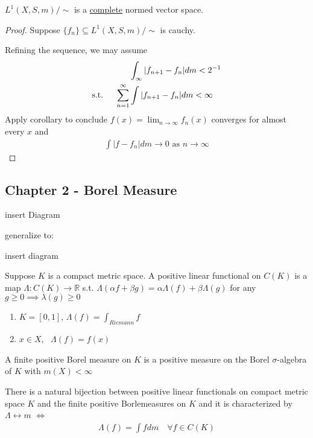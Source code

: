 \begin{corollary}
	$L^{1}(X,S, m) / \sim$ is a \underline{complete} normed vector space.
\end{corollary}

\begin{proof}
	Suppose $\{f_n\} \subseteq L^{1}(X,S, m) / \sim$ is cauchy.

	Refining the sequence, we may assume
	\begin{align*}
	&\int_{\infty}|f_{n+1} - f_{n} | dm < 2^{-1} \\ \text{s.t. \quad}
		\sum_{n=1}^{\infty} &\int | f_{n+1} - f_{n} | dm < \infty
	\end{align*}
	Apply corollary to conclude $f(x) = \lim_{n \to \infty} f_{n}(x)$ converges for almost every $x$ and
	\begin{align*}
		\int |f - f_{n} | dm \to 0 \text{ as } n \to \infty
	\end{align*}
\end{proof}


\subsection{Chapter 2 - Borel Measure}

insert Diagram


generalize to:

insert diagram

\begin{definition}
	Suppose $K$ is a compact metric space. A positive linear functional on $C(K)$ is a map $\Lambda : C(K) \to \mathbb{R}$ s.t.
	$\Lambda(\alpha f + \beta g) = \alpha \Lambda(f) + \beta\Lambda(g)$ for any
	$g \geq 0 \implies \lambda (g) \geq 0$
\end{definition}

\begin{example}
	\begin{enumerate}
		\item $K = [0,1]$, $\Lambda (f) = \int_{Riemann} f$
		\item $x \in X$, \, $\Lambda(f) = f(x)$
	\end{enumerate}
\end{example}

A finite positive Borel measure on $K$ is a positive measure on the Borel $\sigma$-algebra of $K$ with $m(X) < \infty$


\begin{theorem}
	There is a natural bijection between positive linear functionals on compact metric space $K$ and the finite positive Borlemeasures on $K$ and it is characterized by $\Lambda \leftrightarrow m$
	$\iff$
	 \begin{align*}
	\Lambda(f) = \int f dm \quad \forall f \in C(K)
	\end{align*}
\end{theorem}

